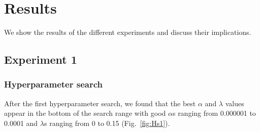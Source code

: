 \chapter{Results}
\label{ch:Results}
We show the results of the different experiments and discuss their implications.

\section{Experiment 1}
\subsection{Hyperparameter search}
After the first hyperparameter search, we found that the best $\alpha$ and $\lambda$ values appear in the bottom of the search range with good $\alpha$s ranging from 0.000001 to 0.0001 and $\lambda$s ranging from 0 to 0.15 (Fig.~\ref{fig:Hs1}).
